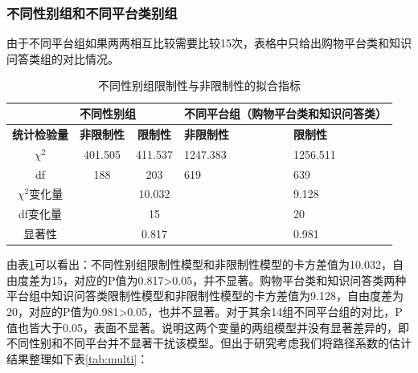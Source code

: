 \documentclass[12pt,UTF8]{ctexart}
\begin{document}
\begin{spacing}{1.25}
\subsubsection{不同性别组和不同平台类别组}
由于不同平台组如果两两相互比较需要比较15次，表格中只给出购物平台类和知识问答类组的对比情况。
\begin{table}[H]
\centering
\caption{不同性别组限制性与非限制性的拟合指标}
\label{tab:constrain2}
\begin{tabular}{@{}cccll@{}}
\toprule
\multicolumn{1}{l}{} & \multicolumn{2}{l}{\textbf{不同性别组}} & \multicolumn{2}{l}{\textbf{不同平台组（购物平台类和知识问答类）}} \\ \midrule
\textbf{统计检验量}       & \textbf{非限制性}    & \textbf{限制性}    & \textbf{非限制性}    & \textbf{限制性}    \\ \midrule
$\chi^{2}$           & 401.505          & 411.537         & 1247.383         & 1256.511        \\
df                   & 188              & 203             & 619              & 639             \\
$\chi^{2}$变化量        &                  & 10.032          &                  & 9.128           \\
df变化量                &                  & 15              &                  & 20              \\
显著性                  &                  & 0.817           &                  & 0.981           \\ \bottomrule
\end{tabular}
\end{table}
由表\ref{tab:constrain2}可以看出：不同性别组限制性模型和非限制性模型的卡方差值为10.032，自由度差为15，对应的P值为0.817>0.05，并不显著。购物平台类和知识问答类两种平台组中知识问答类限制性模型和非限制性模型的卡方差值为9.128，自由度差为20，对应的P值为0.981>0.05，也并不显著。对于其余14组不同平台组的对比，P值也皆大于0.05，表面不显著。说明这两个变量的两组模型并没有显著差异的，即不同性别和不同平台并不显著干扰该模型。但出于研究考虑我们将路径系数的估计结果整理如下表\ref{tab:multi}：
 

\end{spacing}
\end{document}
